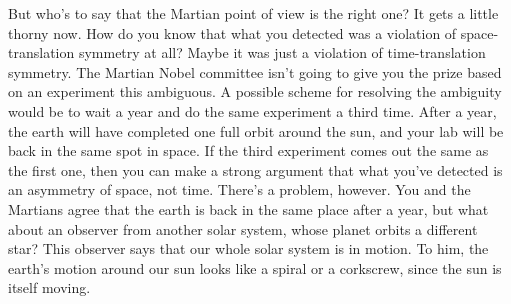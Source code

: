 But who's to say that the Martian point of view is the right one? It gets a little thorny
now. How do you know that what you detected was a violation of space-translation symmetry
at all? Maybe it was just a violation of time-translation symmetry. The Martian Nobel
committee isn't going to give you the prize based on an experiment this ambiguous. A
possible scheme for resolving the ambiguity would be to wait a year and do the same
experiment a third time. After a year, the earth will have completed one full orbit around the
sun, and your lab will be back in the same spot in space. If the third experiment comes out
the same as the first one, then you can make a strong argument that what you've detected is
an asymmetry of space, not time. There's a problem, however. You and the Martians agree
that the earth is back in the same place after a year, but what about an observer from
another solar system, whose planet orbits a different star? This observer says that our
whole solar system is in motion. To him, the earth's motion around our sun looks like a spiral or a
corkscrew, since the sun is itself moving.

